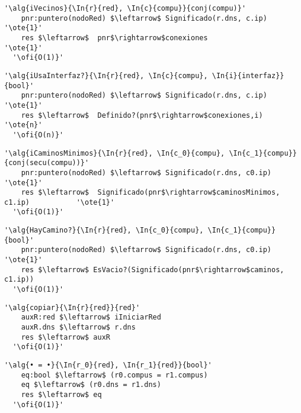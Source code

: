 \begin{lstlisting}[mathescape]
  '\alg{iVecinos}{\In{r}{red}, \In{c}{compu}}{conj(compu)}'
    pnr:puntero(nodoRed) $\leftarrow$ Significado(r.dns, c.ip)                     '\ote{1}'
    res $\leftarrow$  pnr$\rightarrow$conexiones                                   '\ote{1}'
  '\ofi{O(1)}'
\end{lstlisting}

\begin{lstlisting}[mathescape]
  '\alg{iUsaInterfaz?}{\In{r}{red}, \In{c}{compu}, \In{i}{interfaz}}{bool}'
    pnr:puntero(nodoRed) $\leftarrow$ Significado(r.dns, c.ip)                     '\ote{1}'
    res $\leftarrow$  Definido?(pnr$\rightarrow$conexiones,i)                      '\ote{n}'
  '\ofi{O(n)}'
\end{lstlisting}

\begin{lstlisting}[mathescape]
  '\alg{iCaminosMinimos}{\In{r}{red}, \In{c_0}{compu}, \In{c_1}{compu}}{conj(secu(compu))}'
    pnr:puntero(nodoRed) $\leftarrow$ Significado(r.dns, c0.ip)                    '\ote{1}'
    res $\leftarrow$  Significado(pnr$\rightarrow$caminosMinimos, c1.ip)           '\ote{1}'
  '\ofi{O(1)}'
\end{lstlisting}

\begin{lstlisting}[mathescape]
  '\alg{HayCamino?}{\In{r}{red}, \In{c_0}{compu}, \In{c_1}{compu}}{bool}'
    pnr:puntero(nodoRed) $\leftarrow$ Significado(r.dns, c0.ip)                    '\ote{1}'
    res $\leftarrow$ EsVacio?(Significado(pnr$\rightarrow$caminos, c1.ip))                                       
  '\ofi{O(1)}'
\end{lstlisting}

\begin{lstlisting}[mathescape]
  '\alg{copiar}{\In{r}{red}}{red}'
    auxR:red $\leftarrow$ iIniciarRed
    auxR.dns $\leftarrow$ r.dns
    res $\leftarrow$ auxR                                
  '\ofi{O(1)}'
\end{lstlisting}

\begin{lstlisting}[mathescape]
  '\alg{• = •}{\In{r_0}{red}, \In{r_1}{red}}{bool}'
    eq:bool $\leftarrow$ (r0.compus = r1.compus)
    eq $\leftarrow$ (r0.dns = r1.dns)
    res $\leftarrow$ eq                               
  '\ofi{O(1)}'
\end{lstlisting}


 

